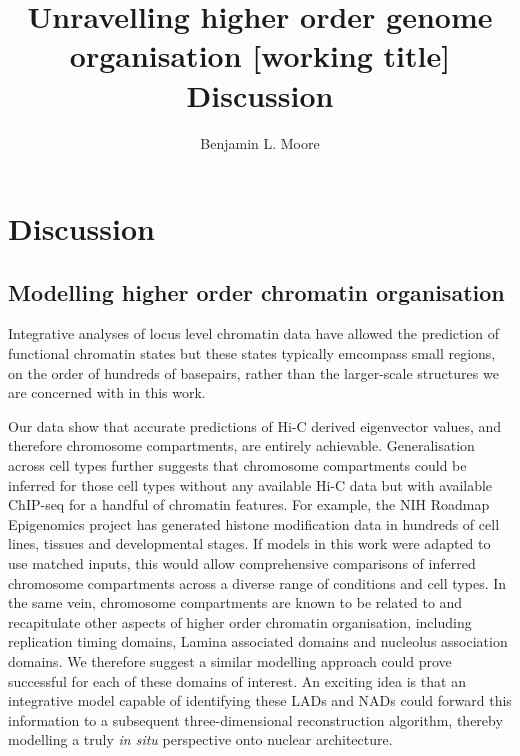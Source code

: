 \documentclass[a4paper,11pt,oneside]{book}
\title{ \vspace{3in} Unravelling higher order genome organisation {\small [working
    title]} \\ \vspace{2em} {\large {\bf Discussion}} }
\author{Benjamin L. Moore}
\begin{document}

\chapter{Discussion}

%
%

\section{Modelling higher order chromatin organisation}

Integrative analyses of locus level chromatin data have allowed the
prediction of functional chromatin states \cite{Ernst2012, Ram2011,
  Dunham2012, Hoffman2013} but these states typically emcompass small
regions, on the order of hundreds of basepairs, rather than the larger-scale structures we are concerned with in this work.

Our data show that accurate predictions of Hi-C derived
eigenvector values, and therefore chromosome compartments, are entirely achievable. Generalisation across cell types further suggests that chromosome compartments could be inferred for those cell types without any available Hi-C data but with available ChIP-seq for a handful of chromatin features. For example, the NIH Roadmap Epigenomics project has generated histone modification data in hundreds of cell lines, tissues and developmental stages.\cite{Bernstein2010, Kundaje2015} If models in this work were adapted to use matched inputs, this would allow comprehensive comparisons of inferred chromosome compartments across a diverse range of conditions and cell types. In the same vein, chromosome compartments are known to be related to and recapitulate other aspects of higher order chromatin organisation, including replication timing domains, Lamina associated domains and nucleolus association domains. We therefore suggest a similar modelling approach could prove successful for each of these domains of interest. An exciting idea is that an integrative model capable of identifying these LADs and NADs could forward this information to a subsequent three-dimensional reconstruction algorithm, thereby modelling a truly \emph{in situ} perspective onto nuclear architecture.
\end{document}
